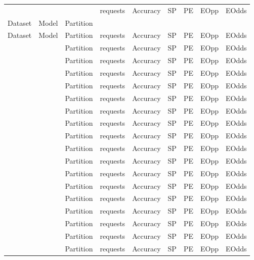\begin{tabular}{lllllllll}
\toprule
        &       &           &  requests &  Accuracy &  SP &  PE &  EOpp &  EOdds \\
Dataset & Model & Partition &           &           &     &     &       &        \\
\midrule
\multirow{75}{*}{Dataset} & \multirow{75}{*}{Model} & Partition &  requests &  Accuracy &  SP &  PE &  EOpp &  EOdds \\
        &       & Partition &  requests &  Accuracy &  SP &  PE &  EOpp &  EOdds \\
        &       & Partition &  requests &  Accuracy &  SP &  PE &  EOpp &  EOdds \\
        &       & Partition &  requests &  Accuracy &  SP &  PE &  EOpp &  EOdds \\
        &       & Partition &  requests &  Accuracy &  SP &  PE &  EOpp &  EOdds \\
        &       & Partition &  requests &  Accuracy &  SP &  PE &  EOpp &  EOdds \\
        &       & Partition &  requests &  Accuracy &  SP &  PE &  EOpp &  EOdds \\
        &       & Partition &  requests &  Accuracy &  SP &  PE &  EOpp &  EOdds \\
        &       & Partition &  requests &  Accuracy &  SP &  PE &  EOpp &  EOdds \\
        &       & Partition &  requests &  Accuracy &  SP &  PE &  EOpp &  EOdds \\
        &       & Partition &  requests &  Accuracy &  SP &  PE &  EOpp &  EOdds \\
        &       & Partition &  requests &  Accuracy &  SP &  PE &  EOpp &  EOdds \\
        &       & Partition &  requests &  Accuracy &  SP &  PE &  EOpp &  EOdds \\
        &       & Partition &  requests &  Accuracy &  SP &  PE &  EOpp &  EOdds \\
        &       & Partition &  requests &  Accuracy &  SP &  PE &  EOpp &  EOdds \\
        &       & Partition &  requests &  Accuracy &  SP &  PE &  EOpp &  EOdds \\
        &       & Partition &  requests &  Accuracy &  SP &  PE &  EOpp &  EOdds \\
        &       & Partition &  requests &  Accuracy &  SP &  PE &  EOpp &  EOdds \\

\end{tabular}
